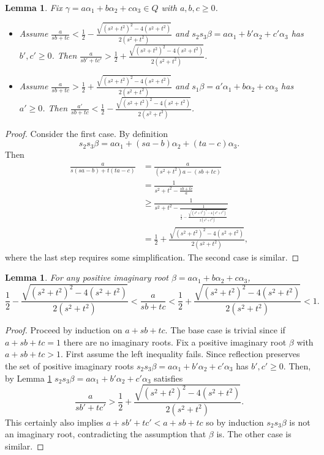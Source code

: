 \documentclass{amsart}
\numberwithin{equation}{section}
\numberwithin{figure}{section}
\numberwithin{table}{section}
\newtheorem{Lemma}[equation]{Lemma}
\theoremstyle{definition}
\begin{document}
\begin{Lemma} \label{lem:ref} 
Fix $\gamma =a\alpha_1 +b\alpha_2+c\alpha_3 \in Q$ with $a,b,c \geq 0$. 
\begin{itemize}
\item Assume $\frac{a}{sb+tc}<  \frac{1}{2}-\frac{\sqrt{(s^2+t^2)^2-4(s^2+t^2)}}{2(s^2+t^2)}$ and
$s_2s_3\beta= a\alpha_1 +b'\alpha_2+c'\alpha_3$ has $b',c' \geq 0$. Then
$\frac{a}{sb'+tc'}>  \frac{1}{2}+\frac{\sqrt{(s^2+t^2)^2-4(s^2+t^2)}}{2(s^2+t^2)}$.

\item Assume  $\frac{a}{sb+tc}>   \frac{1}{2}+\frac{\sqrt{(s^2+t^2)^2-4(s^2+t^2)}}{2(s^2+t^2)}$ and 
$s_1\beta= a'\alpha_1 +b\alpha_2+c\alpha_3$ has $a' \geq 0$. Then
$\frac{a'}{sb+tc}<  \frac{1}{2}-\frac{\sqrt{(s^2+t^2)^2-4(s^2+t^2)}}{2(s^2+t^2)}$.
\end{itemize}
\end{Lemma}

\begin{proof}
Consider the first case. By definition
$$s_2s_3\beta= a\alpha_1 +(sa-b)\alpha_2+(ta-c)\alpha_3.$$
Then
$$
\begin{aligned}
\frac{a}{s(sa-b)+t(ta-c)} &= \frac{a}{(s^2+t^2)a -(sb+tc)}  \\
&=\frac{1}{ s^2+t^2-\frac{sb+tc}{a}} \\
&\geq \frac{1}{ s^2+t^2-  \frac{1}{ \frac{1}{2}-\frac{\sqrt{(s^2+t^2)^2-4(s^2+t^2)}}{2(s^2+t^2)}}  }\\
&=  \frac{1}{2}+\frac{\sqrt{(s^2+t^2)^2-4(s^2+t^2)}}{2(s^2+t^2)},
\end{aligned}
$$
where the last step requires some simplification. The second case is similar. 
\end{proof}

\begin{Lemma} \label{lem:imcond} For any positive imaginary root $\beta=a \alpha_1+b\alpha_2+c\alpha_3$, 
 $$\frac{1}{2}-\frac{\sqrt{(s^2+t^2)^2-4(s^2+t^2)}}{2(s^2+t^2)}< \frac{a}{sb+tc}<  \frac{1}{2}+\frac{\sqrt{(s^2+t^2)^2-4(s^2+t^2)}}{2(s^2+t^2)}<1.$$
\end{Lemma}

\begin{proof}
Proceed by induction on $a+sb+tc$. 
The base case is trivial since if $a+sb+tc=1$ there are no imaginary roots. Fix a positive imaginary root $\beta$ with $a+sb+tc>1$. First assume the left inequality fails. Since reflection preserves the set of positive imaginary roots 
$s_2s_3\beta= a\alpha_1 +b'\alpha_2+c'\alpha_3$ 
has $b',c'\geq0$. Then, by Lemma \ref{lem:ref}
$s_2s_3\beta= a\alpha_1 +b'\alpha_2+c'\alpha_3$ satisfies $$\frac{a}{sb'+tc'}> \frac{1}{2}+\frac{\sqrt{(s^2+t^2)^2-4(s^2+t^2)}}{2(s^2+t^2)}.$$ This certainly also implies $a+sb'+tc'<a+sb+tc$ so by induction $s_2s_3 \beta$ is not an imaginary root, contradicting the assumption that $\beta$ is. The other case is similar. 
\end{proof}
\end{document}
